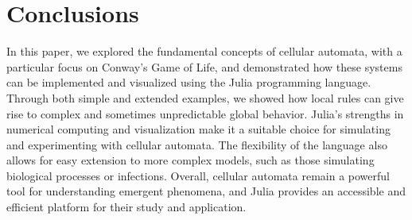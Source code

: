 \documentclass[a4paper,12pt]{llncs}
\numberwithin{equation}{section}
\begin{document}
\section{Conclusions}
In this paper, we explored the fundamental concepts of cellular automata, with a particular focus on Conway's Game of Life,
and demonstrated how these systems can be implemented and visualized using the Julia programming language.
Through both simple and extended examples, we showed how local rules can give rise to complex and sometimes unpredictable global behavior.
Julia's strengths in numerical computing and visualization make it a suitable choice for simulating and experimenting with cellular automata.
The flexibility of the language also allows for easy extension to more complex models, such as those simulating biological processes or infections.
Overall, cellular automata remain a powerful tool for understanding emergent phenomena,
and Julia provides an accessible and efficient platform for their study and application.



\end{document}
